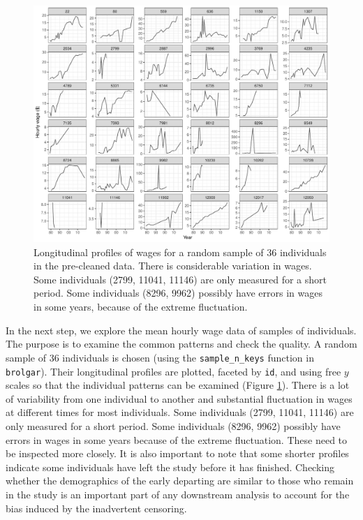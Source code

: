 \documentclass{article}
\begin{document}
\begin{figure}

{\centering \includegraphics[width=1\linewidth]{figures/sample-plot-1} 

}

\caption{Longitudinal profiles of wages for a random sample of 36 individuals in the pre-cleaned data. There is considerable variation in wages. Some individuals  (2799, 11041, 11146) are only measured for a short period. Some individuals (8296, 9962) possibly have errors in wages in some years, because of the extreme fluctuation.}\label{fig:sample-plot}
\end{figure}

In the next step, we explore the mean hourly wage data of samples of individuals. The purpose is to examine the common patterns and check the quality. A random sample of 36 individuals is chosen (using the \texttt{sample\_n\_keys} function in \texttt{brolgar}). Their longitudinal profiles are plotted, faceted by \texttt{id}, and using free \(y\) scales so that the individual patterns can be examined (Figure \ref{fig:sample-plot}). There is a lot of variability from one individual to another and substantial fluctuation in wages at different times for most individuals. Some individuals (2799, 11041, 11146) are only measured for a short period. Some individuals (8296, 9962) possibly have errors in wages in some years because of the extreme fluctuation. These need to be inspected more closely. It is also important to note that some shorter profiles indicate some individuals have left the study before it has finished. Checking whether the demographics of the early departing are similar to those who remain in the study is an important part of any downstream analysis to account for the bias induced by the inadvertent censoring.
\end{document}

